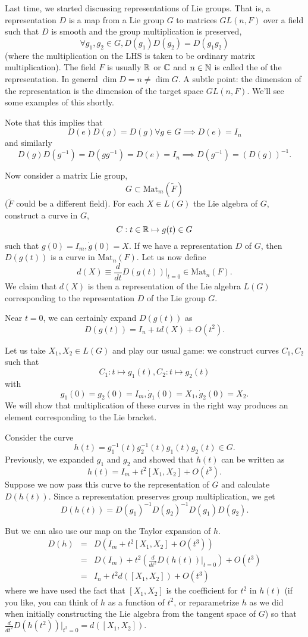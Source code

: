 Last time, we started discussing representations of Lie groups. That is, a representation $D$ is a map from a Lie group $G$ to matrices $GL(n,F)$ over a field such that $D$ is smooth and the group multiplication is preserved,
$$\forall g_1,g_2\in G, D(g_1)D(g_2)=D(g_1g_2)$$
(where the multiplication on the LHS is taken to be ordinary matrix multiplication). The field $F$ is usually $\mathbb{R}$ or $\mathbb{C}$ and $n\in\mathbb{N}$ is called the  of the representation. In general $\dim D = n \neq \dim G$. A subtle point: the dimension of the representation is the dimension of the target space $GL(n,F)$. We'll see some examples of this shortly.

Note that this implies that
$$D(e)D(g)=D(g)\forall g\in G \implies D(e)=I_n$$
and similarly
$$D(g)D(g^{-1})=D(gg^{-1})=D(e)=I_n\implies D(g^{-1})=(D(g))^{-1}.$$

Now consider a matrix Lie group,
$$G\subset \text{Mat}_m(\tilde F)$$ ($\tilde F$ could be a different field). For each $X\in L(G)$ the Lie algebra of $G$, construct a curve in $G$,
$$C:t\in \mathbb{R} \mapsto g(t)\in G$$ such that $g(0)=I_m,\dot g(0)=X$. If we have a representation $D$ of $G$, then $D(g(t))$ is a curve in $\text{Mat}_n(F).$ Let us now define
$$d(X)\equiv \frac{d}{dt}D(g(t))|_{t=0}\in \text{Mat}_n(F).$$
We claim that $d(X)$ is then a representation of the Lie algebra $L(G)$ corresponding to the representation $D$ of the Lie group $G$.

Near $t=0$, we can certainly expand $D(g(t))$ as
$$D(g(t))=I_n+t d(X)+O(t^2).$$

Let us take $X_1,X_2\in L(G)$ and play our usual game: we construct curves $C_1,C_2$ such that
$$C_1:t\mapsto g_1(t),C_2:t\mapsto g_2(t)$$
with
$$g_1(0)=g_2(0)=I_m, \dot g_1(0)=X_1, \dot g_2(0)=X_2.$$
We will show that multiplication of these curves in the right way produces an element corresponding to the Lie bracket.

Consider the curve
$$h(t)=g_1^{-1}(t)g_2^{-1}(t) g_1(t) g_2(t) \in G.$$
Previously, we expanded $g_1$ and $g_2$ and showed that $h(t)$ can be written as
$$h(t)=I_m+t^2[X_1,X_2]+O(t^3).$$
Suppose we now pass this curve to the representation of $G$ and calculate $D(h(t))$. Since a representation preserves group multiplication, we get
$$D(h(t))=D(g_1)^{-1}D(g_2)^{-1}D(g_1)D(g_2).$$

But we can also use our map on the Taylor expansion of $h$.
\begin{eqnarray*}
D(h)&=& D(I_m+ t^2[X_1,X_2]+O(t^3))\\
&=&D(I_m)+t^2 \left(\frac{d}{dt^2} D(h(t))|_{t=0}\right)+O(t^3)\\
&=&I_n +t^2 d([X_1,X_2])+O(t^3)
\end{eqnarray*}
where we have used the fact that $[X_1,X_2]$ is the coefficient for $t^2$ in $h(t)$ (if you like, you can think of $h$ as a function of $t^2$, or reparametrize $h$ as we did when initially constructing the Lie algebra from the tangent space of $G$) so that $\frac{d}{dt^2}D(h(t^2))|_{t^2=0}=d([X_1,X_2]).$

